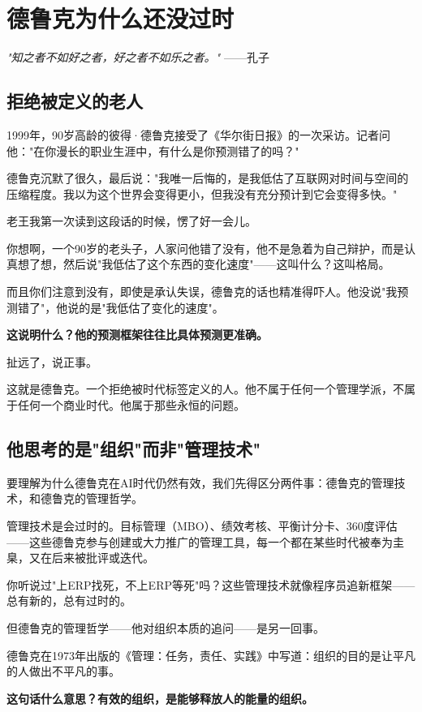 \chapter{德鲁克为什么还没过时}


\textit{"知之者不如好之者，好之者不如乐之者。"}
——孔子


\section{拒绝被定义的老人}


1999年，90岁高龄的彼得·德鲁克接受了《华尔街日报》的一次采访。记者问他："在你漫长的职业生涯中，有什么是你预测错了的吗？"

德鲁克沉默了很久，最后说："我唯一后悔的，是我低估了互联网对时间与空间的压缩程度。我以为这个世界会变得更小，但我没有充分预计到它会变得多快。"

老王我第一次读到这段话的时候，愣了好一会儿。

你想啊，一个90岁的老头子，人家问他错了没有，他不是急着为自己辩护，而是认真想了想，然后说"我低估了这个东西的变化速度"——这叫什么？这叫格局。

而且你们注意到没有，即使是承认失误，德鲁克的话也精准得吓人。他没说"我预测错了"，他说的是"我低估了变化的速度"。

\textbf{这说明什么？他的预测框架往往比具体预测更准确。}

扯远了，说正事。

这就是德鲁克。一个拒绝被时代标签定义的人。他不属于任何一个管理学派，不属于任何一个商业时代。他属于那些永恒的问题。


\section{他思考的是"组织"而非"管理技术"}


要理解为什么德鲁克在AI时代仍然有效，我们先得区分两件事：德鲁克的管理技术，和德鲁克的管理哲学。

管理技术是会过时的。目标管理（MBO）、绩效考核、平衡计分卡、360度评估——这些德鲁克参与创建或大力推广的管理工具，每一个都在某些时代被奉为圭臬，又在后来被批评或迭代。

你听说过"上ERP找死，不上ERP等死"吗？这些管理技术就像程序员追新框架——总有新的，总有过时的。

但德鲁克的管理哲学——他对组织本质的追问——是另一回事。

德鲁克在1973年出版的《管理：任务，责任、实践》中写道：组织的目的是让平凡的人做出不平凡的事。

\textbf{这句话什么意思？有效的组织，是能够释放人的能量的组织。}

